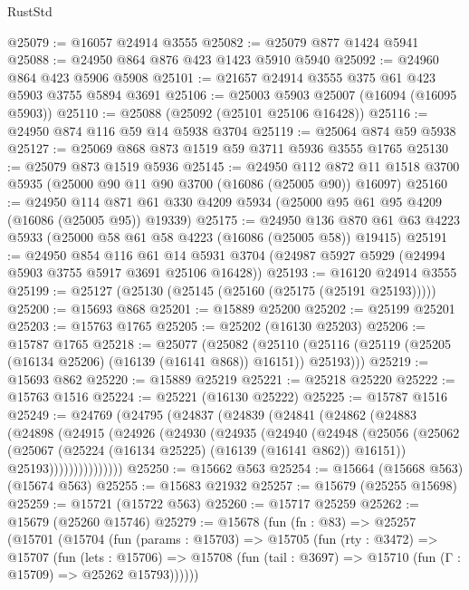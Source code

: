 \begin{lexlean}{RustStd}
\begin{coremodule}
@25079 := @16057 @24914 @3555
@25082 := @25079 @877 @1424 @5941
@25088 := @24950 @864 @876 @423 @1423 @5910 @5940
@25092 := @24960 @864 @423 @5906 @5908
@25101 := @21657 @24914 @3555 @375 @61 @423 @5903 @3755 @5894 @3691
@25106 := @25003 @5903 @25007 (@16094 (@16095 @5903))
@25110 := @25088 (@25092 (@25101 @25106 @16428))
@25116 := @24950 @874 @116 @59 @14 @5938 @3704
@25119 := @25064 @874 @59 @5938
@25127 := @25069 @868 @873 @1519 @59 @3711 @5936 @3555 @1765
@25130 := @25079 @873 @1519 @5936
@25145 := @24950
    @112
    @872
    @11
    @1518
    @3700
    @5935
    (@25000 @90 @11 @90 @3700 (@16086 (@25005 @90)) @16097)
@25160 := @24950
    @114
    @871
    @61
    @330
    @4209
    @5934
    (@25000 @95 @61 @95 @4209 (@16086 (@25005 @95)) @19339)
@25175 := @24950
    @136
    @870
    @61
    @63
    @4223
    @5933
    (@25000 @58 @61 @58 @4223 (@16086 (@25005 @58)) @19415)
@25191 := @24950
    @854
    @116
    @61
    @14
    @5931
    @3704
    (@24987 @5927 @5929 (@24994 @5903 @3755 @5917 @3691 @25106 @16428))
@25193 := @16120 @24914 @3555
@25199 := @25127 (@25130 (@25145 (@25160 (@25175 (@25191 @25193)))))
@25200 := @15693 @868
@25201 := @15889 @25200
@25202 := @25199 @25201
@25203 := @15763 @1765
@25205 := @25202 (@16130 @25203)
@25206 := @15787 @1765
@25218 := @25077
    (@25082
      (@25110 (@25116 (@25119 (@25205 (@16134 @25206) (@16139 (@16141 @868)) @16151)) @25193)))
@25219 := @15693 @862
@25220 := @15889 @25219
@25221 := @25218 @25220
@25222 := @15763 @1516
@25224 := @25221 (@16130 @25222)
@25225 := @15787 @1516
@25249 := @24769
    (@24795
      (@24837
        (@24839
          (@24841
            (@24862
              (@24883
                (@24898
                  (@24915
                    (@24926
                      (@24930
                        (@24935
                          (@24940
                            (@24948
                              (@25056
                                (@25062
                                  (@25067 (@25224 (@16134 @25225) (@16139 (@16141 @862)) @16151))
                                  @25193)))))))))))))))
@25250 := @15662 @563
@25254 := @15664 (@15668 @563) (@15674 @563)
@25255 := @15683 @21932
@25257 := @15679 (@25255 @15698)
@25259 := @15721 (@15722 @563)
@25260 := @15717 @25259
@25262 := @15679 (@25260 @15746)
@25279 := @15678
    (fun (fn : @83) =>
    @25257
      (@15701
        (@15704
          (fun (params : @15703) =>
          @15705
            (fun (rty : @3472) =>
            @15707
              (fun (lets : @15706) =>
              @15708 (fun (tail : @3697) => @15710 (fun (Γ : @15709) => @25262 @15793))))))

\end{coremodule}
\end{lexlean}
